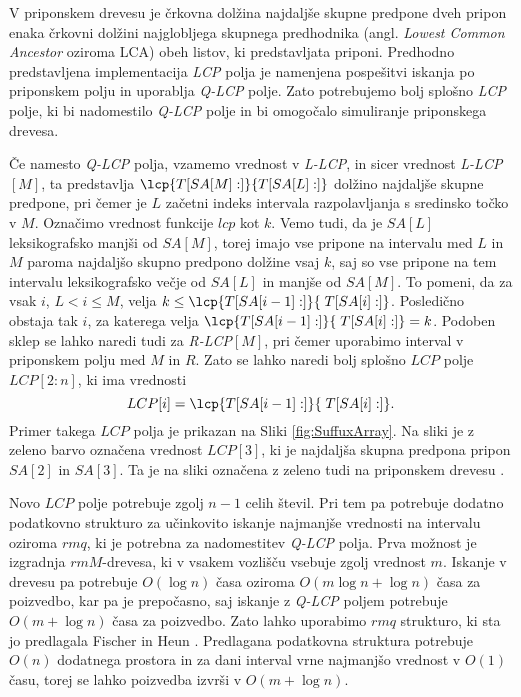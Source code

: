 V priponskem drevesu je črkovna dolžina najdaljše skupne predpone dveh pripon enaka črkovni dolžini najglobljega skupnega predhodnika (angl. \textit{Lowest Common Ancestor} oziroma LCA) obeh listov, ki predstavljata priponi. Predhodno predstavljena implementacija \textit{LCP} polja je namenjena pospešitvi iskanja po priponskem polju in uporablja \textit{Q-LCP} polje. Zato potrebujemo bolj splošno \textit{LCP} polje, ki bi nadomestilo \textit{Q-LCP} polje in bi omogočalo simuliranje priponskega drevesa.

Če namesto \textit{Q-LCP} polja, vzamemo vrednost v \textit{L-LCP}, in sicer vrednost \textit{L-LCP}$[M]$, ta predstavlja $\lcp{T[SA[M]:]}{T[SA[L]:]}$ dolžino najdaljše skupne predpone, pri čemer je $L$ začetni indeks intervala razpolavljanja s sredinsko točko v $M$. Označimo vrednost funkcije $lcp$ kot $k$. Vemo tudi, da je $SA[L]$ leksikografsko manjši od $SA[M]$, torej imajo vse pripone na intervalu med $L$ in $M$ paroma najdaljšo skupno predpono dolžine vsaj $k$, saj so vse pripone na tem intervalu leksikografsko večje od $SA[L]$ in manjše od $SA[M]$. To pomeni, da za vsak $i$, $L<i\le M$, velja $k\le \lcp{T[SA[i-1]:]}{\; T[SA[i]:]}$. Posledično obstaja tak $i$, za katerega velja $\lcp{T[SA[i-1]:]}{\; T[SA[i]:]}=k$. Podoben sklep se lahko naredi tudi za \textit{R-LCP}$[M]$, pri čemer uporabimo interval v priponskem polju med $M$ in $R$. Zato se lahko naredi bolj splošno $LCP$ polje $LCP[2:n]$, ki ima vrednosti 
$$
    LCP[i]=\lcp{T[SA[i-1]:]}{\; T[SA[i]:]}.
$$
Primer takega $LCP$ polja je prikazan na Sliki \ref{fig:SuffuxArray}. Na sliki je z zeleno barvo označena vrednost $LCP[3]$, ki je najdaljša skupna predpona pripon $SA[2]$ in $SA[3]$. Ta je na sliki označena z zeleno tudi na priponskem drevesu \cite{Abouelhoda2004, Kasai2001}.

Novo $LCP$ polje potrebuje zgolj $n-1$ celih števil. Pri tem pa potrebuje dodatno podatkovno strukturo za učinkovito iskanje najmanjše vrednosti na intervalu oziroma $rmq$, ki je potrebna za nadomestitev \textit{Q-LCP} polja. Prva možnost je izgradnja $rmM$-drevesa, ki v vsakem vozlišču vsebuje zgolj vrednost $m$. Iskanje v drevesu pa potrebuje $O(\log{n})$ časa oziroma $O(m\log{n}+\log{n})$ časa za poizvedbo, kar pa je prepočasno, saj iskanje z \textit{Q-LCP} poljem potrebuje $O(m+\log{n})$ časa za poizvedbo. Zato lahko uporabimo $rmq$ strukturo, ki sta jo predlagala Fischer in Heun \cite{Fischer2007}. Predlagana podatkovna struktura potrebuje $O(n)$ dodatnega prostora in za dani interval vrne najmanjšo vrednost v $O(1)$ času, torej se lahko poizvedba izvrši v $O(m+\log{n})$.

